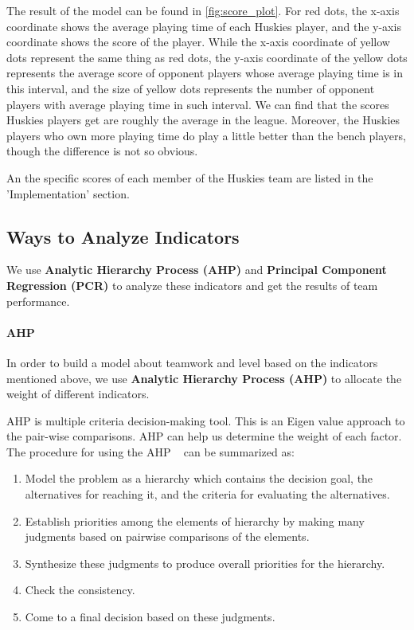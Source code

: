 \documentclass[12pt]{mcmthesis}
\begin{document}
The result of the model can be found in \ref{fig:score_plot}. For red dots, the x-axis coordinate shows the average playing time of each Huskies player, and the y-axis coordinate shows the score of the player. While the x-axis coordinate of yellow dots represent the same thing as red dots, the y-axis coordinate of the yellow dots represents the average score of opponent players whose average playing time is in this interval, and the size of yellow dots represents the number of opponent players with average playing time in such interval.  We can find that the scores Huskies players get are roughly the average in the league. Moreover, the Huskies players who own more playing time do play a little better than the bench players, though the difference is not so obvious.

	An the specific scores of each member of the Huskies team are listed in the 'Implementation' section.

\subsection{Ways to Analyze Indicators}
	We use \textbf{Analytic Hierarchy Process (AHP)} and \textbf{Principal Component Regression (PCR)} to analyze these indicators and get the results of team performance.
	
	\paragraph{AHP}
	In order to build a model about teamwork and level based on the indicators mentioned above, we use \textbf{Analytic Hierarchy Process (AHP)} to allocate the weight of different indicators.
	
	AHP is multiple criteria decision-making tool. This is an Eigen value approach to the pair-wise comparisons. AHP can help us determine the weight of each factor.~\cite{analytic} The procedure for using the AHP ~\cite{ahp} can be summarized as:
	\begin{enumerate}
		\item Model the problem as a hierarchy which contains the decision goal, the alternatives for reaching it, and the criteria for evaluating the alternatives.
		\item Establish priorities among the elements of hierarchy by making many judgments based on pairwise comparisons of the elements.
		\item Synthesize these judgments to produce overall priorities for the hierarchy.
		\item Check the consistency.
		\item Come to a final decision based on these judgments.
	\end{enumerate}
\end{document}
